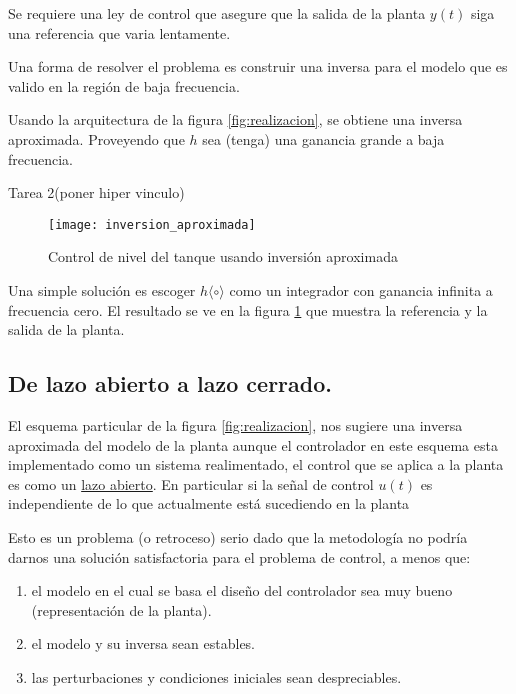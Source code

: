 \documentclass[a4paper]{article}
\begin{document}
Se requiere una ley de control que asegure que la salida de la planta $y(t)$ siga una referencia que varia lentamente.

Una forma de resolver el problema es construir una inversa para el modelo que es valido en la región de baja frecuencia.

Usando la arquitectura de la figura \ref{fig:realizacion}, se obtiene una inversa aproximada. Proveyendo que $h$ sea (tenga) una ganancia grande a baja frecuencia.

Tarea 2(poner hiper vinculo)

\begin{figure}[!h]
\centering
\texttt{[image: inversion\_aproximada]}
\caption{Control de nivel del tanque usando inversión aproximada}
\label{fig:inversionaproximada}
\end{figure}


Una simple solución es escoger $h\langle \circ \rangle$ como un integrador con ganancia infinita a frecuencia cero. El resultado se ve en la figura \ref{fig:inversionaproximada} que muestra la referencia y la salida de la planta.

\subsection{De lazo abierto a lazo cerrado.}

El esquema particular de la figura \ref{fig:realizacion}, nos sugiere una inversa aproximada del modelo de la planta aunque el controlador en este esquema esta implementado como un sistema realimentado, el control que se aplica a la planta es como un \underline{lazo abierto}. En particular si la señal de control $u(t)$ es independiente de lo que actualmente está sucediendo en la planta

Esto es un problema (o retroceso) serio dado que la metodología no podría darnos una solución satisfactoria para el problema de control, a menos que:

\begin{enumerate}
		\item el modelo en el cual se basa el diseño del controlador sea muy bueno (representación de la planta).
		\item el modelo y su inversa sean estables.
		\item las perturbaciones y condiciones iniciales sean despreciables.
\end{enumerate}
\end{document}
